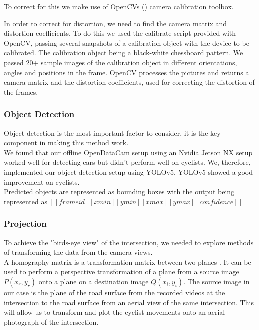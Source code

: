 To correct for this we make use of OpenCVs (\cite{noauthor_opencv/opencv_2021}) camera calibration toolbox.

In order to correct for distortion, we need to find the camera matrix and distortion coefficients. To do this we used the calibrate script provided with OpenCV,
passing several snapshots of a calibration object with the device to be calibrated. The calibration object being a black-white chessboard pattern.
We passed 20+ sample images of the calibration object in different orientations, angles and positions in the frame. OpenCV processes the pictures and
returns a camera matrix and the distortion coefficients, used for correcting the distortion of the frames.
\ \\

\subsubsection{Object Detection}
Object detection is the most important factor to consider, it is the key component in making this method work.
\ \\

We found that our offline OpenDataCam setup using an Nvidia Jetson NX setup worked well for detecting cars but didn't perform well on cyclists. 
We, therefore, implemented our object detection setup using
YOLOv5. YOLOv5 showed a good improvement on cyclists.
\ \\ 
Predicted objects are represented as bounding boxes with the output being represented as $[[frame id][xmin][ymin][xmax][ymax][confidence]]$

\subsubsection{Projection}
To achieve the "birds-eye view" of the intersection, we needed to explore methods of 
transforming the data from the camera views.  
\ \\
A homography matrix is a transformation matrix between two planes \cite{hartley_zisserman_2004}. It 
can be used to perform a perspective transformation of a plane from a source image $P(x_r, y_r)$ onto 
a plane on a destination image $Q(x_i, y_i)$.
The source image in our case is the plane of the road surface from the recorded videos at the intersection 
to the road surface from an aerial view of the same intersection. 
This will allow us to transform and plot the cyclist movements onto an aerial photograph of the intersection.
\ \\ 

